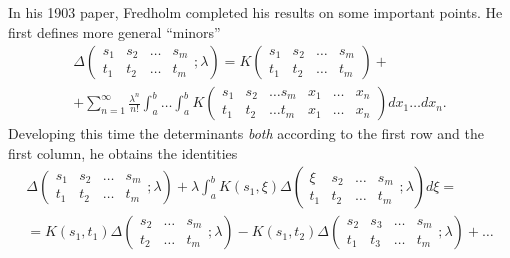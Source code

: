 \documentclass[12pt,a4paper,leqno,twoside]{extbook}
\begin{document}
In his 1903 paper, Fredholm completed his results on some important points. He first defines more general ``minors''
\begin{equation}
    \label{eq:5.13}
    \begin{gathered}
        \Delta
        \left(
        \begin{matrix}
            s_1 & s_2 & \ldots & s_m \\
            t_1 & t_2 & \ldots & t_m
        \end{matrix}
        ; \lambda
        \right)
        = K
        \left(
        \begin{matrix}
            s_1 & s_2 & \ldots & s_m \\
            t_1 & t_2 & \ldots & t_m
        \end{matrix}
        \right)
        + \\
        + \sum_{n=1}^\infty \frac{\lambda^n}{n!} \int_a^b \ldots \int_a^b K
        \left(
        \begin{matrix}
            s_1 & s_2 & \ldots s_m & x_1 & \ldots & x_n \\
            t_1 & t_2 & \ldots t_m & x_1 & \ldots & x_n
        \end{matrix}
        \right)
        dx_1 \ldots dx_n.
    \end{gathered}
\end{equation}
Developing this time the determinants \emph{both} according to the first row and the first column, he obtains the identities
\begin{equation}
    \label{eq:5.14}
    \begin{gathered}
        \Delta
        \left(
        \begin{matrix}
            s_1 & s_2 & \ldots & s_m \\
            t_1 & t_2 & \ldots & t_m
        \end{matrix}
        ; \lambda
        \right)
        + \lambda \int_a^b K(s_1, \xi) \Delta
        \left(
        \begin{matrix}
            \xi & s_2 & \ldots & s_m \\
            t_1 & t_2 & \ldots & t_m
        \end{matrix}
        ; \lambda
        \right)
        d\xi = \\
        = K(s_1, t_1) \Delta
        \left(
        \begin{matrix}
            s_2 & \ldots & s_m \\
            t_2 & \ldots & t_m
        \end{matrix}
        ; \lambda
        \right)
        - K(s_1, t_2) \Delta
        \left(
        \begin{matrix}
            s_2 & s_3 & \ldots & s_m \\
            t_1 & t_3 & \ldots & t_m
        \end{matrix}
        ; \lambda
        \right)
        + \ldots
    \end{gathered}
\end{equation}
\end{document}
